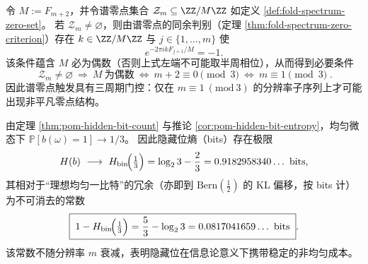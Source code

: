 

\begin{conclusion}[谱零点的三周期选择律：\texorpdfstring{$\mathcal Z_m\neq\varnothing$}{Z_m nonempty} 必迫使 \texorpdfstring{$m\equiv 1\ (\mathrm{mod}\ 3)$}{m=1 mod 3}]\label{con:pom-fold-spectrum-zero-selection}
令 \(M:=F_{m+2}\)，并令谱零点集合 \(\mathcal Z_m\subseteq \ZZ/M\ZZ\) 如定义 \ref{def:fold-spectrum-zero-set}。
若 \(\mathcal Z_m\neq\varnothing\)，则由谱零点的同余判别（定理 \ref{thm:fold-spectrum-zero-criterion}）存在 \(k\in\ZZ/M\ZZ\) 与 \(j\in\{1,\dots,m\}\) 使
\[
e^{-2\pi i kF_{j+1}/M}=-1.
\]
该条件蕴含 \(M\) 必为偶数（否则上式左端不可能取半周相位），从而得到必要条件
\[
\boxed{\;
\mathcal Z_m\neq\varnothing\ \Longrightarrow\ M\ \text{为偶数}\ \Longleftrightarrow\ m+2\equiv 0\pmod 3\ \Longleftrightarrow\ m\equiv 1\pmod 3\; }.
\]
因此谱零点触发具有三周期门控：仅在 \(m\equiv 1\ (\mathrm{mod}\ 3)\) 的分辨率子序列上才可能出现非平凡零点结构。
\end{conclusion}

\begin{conclusion}\label{con:pom-hidden-bit-redundancy-constant}
由定理 \ref{thm:pom-hidden-bit-count} 与推论 \ref{cor:pom-hidden-bit-entropy}，均匀微态下 \(\mathbb P[b(\omega)=1]\to 1/3\)。
因此隐藏位熵（bits）存在极限
\[
H(b)\ \longrightarrow\ H_{\mathrm{bin}}\!\Bigl(\tfrac13\Bigr)
=\log_2 3-\frac{2}{3}
=0.9182958340\ldots\ \mathrm{bits},
\]
其相对于“理想均匀一比特”的冗余（亦即到 \(\mathrm{Bern}(\tfrac12)\) 的 KL 偏移，按 bits 计）为不可消去的常数
\[
\boxed{\;
1-H_{\mathrm{bin}}\!\Bigl(\tfrac13\Bigr)
=\frac53-\log_2 3
=0.0817041659\ldots\ \mathrm{bits}\; }.
\]
该常数不随分辨率 \(m\) 衰减，表明隐藏位在信息论意义下携带稳定的非均匀成本。
\end{conclusion}

